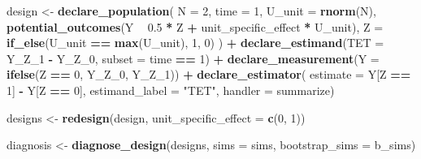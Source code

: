 \documentclass[
]{article}
\newenvironment{Shaded}{\begin{snugshade}}{\end{snugshade}}
\newcommand{\DataTypeTok}[1]{\textcolor[rgb]{0.13,0.29,0.53}{#1}}
\newcommand{\DecValTok}[1]{\textcolor[rgb]{0.00,0.00,0.81}{#1}}
\newcommand{\FloatTok}[1]{\textcolor[rgb]{0.00,0.00,0.81}{#1}}
\newcommand{\KeywordTok}[1]{\textcolor[rgb]{0.13,0.29,0.53}{\textbf{#1}}}
\newcommand{\NormalTok}[1]{#1}
\newcommand{\OperatorTok}[1]{\textcolor[rgb]{0.81,0.36,0.00}{\textbf{#1}}}
\newcommand{\StringTok}[1]{\textcolor[rgb]{0.31,0.60,0.02}{#1}}
\begin{document}
\begin{Shaded}
\begin{Highlighting}[]
\NormalTok{design <-}\StringTok{ }
\StringTok{  }\KeywordTok{declare_population}\NormalTok{(}
    \DataTypeTok{N =} \DecValTok{2}\NormalTok{, }
    \DataTypeTok{time =} \DecValTok{1}\NormalTok{,}
    \DataTypeTok{U_unit =} \KeywordTok{rnorm}\NormalTok{(N),}
    \KeywordTok{potential_outcomes}\NormalTok{(Y }\OperatorTok{~}\StringTok{ }\FloatTok{0.5} \OperatorTok{*}\StringTok{ }\NormalTok{Z }\OperatorTok{+}\StringTok{ }\NormalTok{unit_specific_effect }\OperatorTok{*}\StringTok{ }\NormalTok{U_unit),}
    \DataTypeTok{Z =} \KeywordTok{if_else}\NormalTok{(U_unit }\OperatorTok{==}\StringTok{ }\KeywordTok{max}\NormalTok{(U_unit), }\DecValTok{1}\NormalTok{, }\DecValTok{0}\NormalTok{)}
\NormalTok{  ) }\OperatorTok{+}\StringTok{ }
\StringTok{  }\KeywordTok{declare_estimand}\NormalTok{(}\DataTypeTok{TET =}\NormalTok{ Y_Z_}\DecValTok{1} \OperatorTok{-}\StringTok{ }\NormalTok{Y_Z_}\DecValTok{0}\NormalTok{, }\DataTypeTok{subset =}\NormalTok{ time }\OperatorTok{==}\StringTok{ }\DecValTok{1}\NormalTok{) }\OperatorTok{+}\StringTok{ }
\StringTok{  }\KeywordTok{declare_measurement}\NormalTok{(}\DataTypeTok{Y =} \KeywordTok{ifelse}\NormalTok{(Z }\OperatorTok{==}\StringTok{ }\DecValTok{0}\NormalTok{, Y_Z_}\DecValTok{0}\NormalTok{, Y_Z_}\DecValTok{1}\NormalTok{)) }\OperatorTok{+}\StringTok{ }
\StringTok{  }\KeywordTok{declare_estimator}\NormalTok{(}
    \DataTypeTok{estimate =}\NormalTok{ Y[Z }\OperatorTok{==}\StringTok{ }\DecValTok{1}\NormalTok{] }\OperatorTok{-}\StringTok{ }\NormalTok{Y[Z }\OperatorTok{==}\StringTok{ }\DecValTok{0}\NormalTok{], }
    \DataTypeTok{estimand_label =} \StringTok{"TET"}\NormalTok{, }\DataTypeTok{handler =}\NormalTok{ summarize)}

\NormalTok{designs <-}\StringTok{ }\KeywordTok{redesign}\NormalTok{(design, }\DataTypeTok{unit_specific_effect =} \KeywordTok{c}\NormalTok{(}\DecValTok{0}\NormalTok{, }\DecValTok{1}\NormalTok{))}
\end{Highlighting}
\end{Shaded}

\begin{Shaded}
\begin{Highlighting}[]
\NormalTok{diagnosis <-}\StringTok{ }\KeywordTok{diagnose_design}\NormalTok{(designs, }\DataTypeTok{sims =}\NormalTok{ sims, }\DataTypeTok{bootstrap_sims =}\NormalTok{ b_sims)}
\end{Highlighting}
\end{Shaded}
\end{document}
